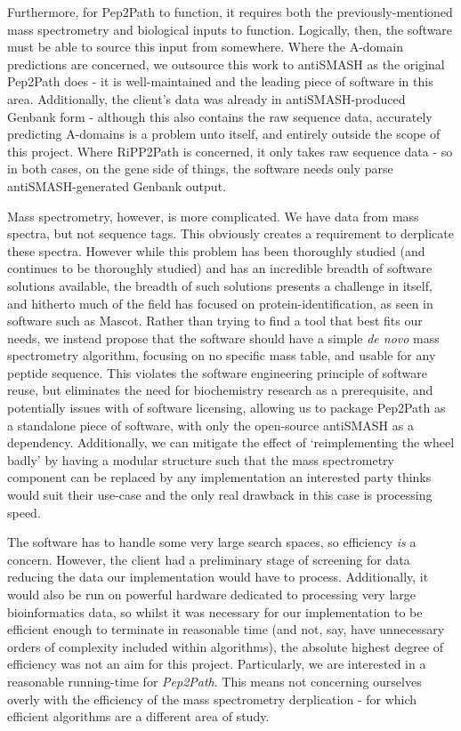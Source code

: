 \documentclass{l4proj}
\newcommand{\cit}[1]{\citep{#1}}
\begin{document}
Furthermore, for Pep2Path to function, it requires both the previously-mentioned mass spectrometry and biological inputs to function. Logically, then, the software must be able to source this input from somewhere. Where the A-domain predictions are concerned, we outsource this work to antiSMASH as the original Pep2Path does - it is well-maintained and the leading piece of software in this area. Additionally, the client's data was already in antiSMASH-produced Genbank form - although this also contains the raw sequence data, accurately predicting A-domains is a problem unto itself, and entirely outside the scope of this project. Where RiPP2Path is concerned, it only takes raw sequence data - so in both cases, on the gene side of things, the software needs only parse antiSMASH-generated Genbank output.

Mass spectrometry, however, is more complicated. We have data from mass spectra, but not sequence tags. This obviously creates a requirement to derplicate these spectra. However while this problem has been thoroughly studied (and continues to be thoroughly studied) and has an incredible breadth of software solutions available, the breadth of such solutions presents a challenge in itself, and hitherto much of the field has focused on protein-identification, \cit{msomics} as seen in software such as Mascot. \cit{mascot} Rather than trying to find a tool that best fits our needs, we instead propose that the software should have a simple \textit{de novo} mass spectrometry algorithm, focusing on no specific mass table, and usable for any peptide sequence. This violates the software engineering principle of software reuse, but eliminates the need for biochemistry research as a prerequisite, and potentially issues with of software licensing, allowing us to package Pep2Path as a standalone piece of software, with only the open-source antiSMASH as a dependency. Additionally, we can mitigate the effect of `reimplementing the wheel badly' by having a modular structure such that the mass spectrometry component can be replaced by any implementation an interested party thinks would suit their use-case and the only real drawback in this case is processing speed.

The software has to handle some very large search spaces, so efficiency \textit{is} a concern. However, the client had a preliminary stage of screening for data reducing the data our implementation would have to process. Additionally, it would also be run on powerful hardware dedicated to processing very large bioinformatics data, so whilst it was necessary for our implementation to be efficient enough to terminate in reasonable time (and not, say, have unnecessary orders of complexity included within algorithms), the absolute highest degree of efficiency was not an aim for this project. Particularly, we are interested in a reasonable running-time for \textit{Pep2Path}. This means not concerning ourselves overly with the efficiency of the mass spectrometry derplication - for which efficient algorithms are a different area of study.
\end{document}
